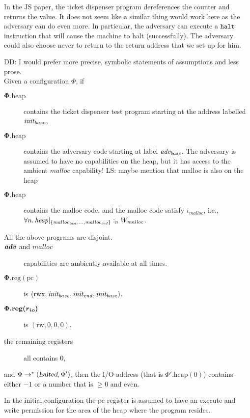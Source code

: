 \documentclass{article}
\newcommand{\restrictfun}[1]{|_{#1}}
\newcommand\lau[1]{{\color{purple} \sf \footnotesize {LS: #1}}\\}
\newcommand\dominique[1]{{\color{purple} \sf \footnotesize {DD: #1}}\\}
\newcommand{\var}[1]{\mathit{#1}}
\newcommand{\pcreg}{\mathrm{pc}}
\newcommand{\heap}{\var{heap}}
\newcommand{\plainproj}[1]{\mathrm{#1}}
\newcommand{\memheap}[1][\Phi]{#1.\plainproj{heap}}
\newcommand{\memreg}[1][\Phi]{#1.\plainproj{reg}}
\newcommand{\halted}{\textsl{halted}}
\newcommand{\heapSat}[3][\heap]{#1 :_{#2} #3}
\newcommand{\codelabel}[1]{\mathit{#1}}
\newcommand{\malloc}{\codelabel{malloc}}
\newcommand{\zinstr}[1]{\mathtt{#1}}
\newcommand{\halt}{\zinstr{halt}}
\newcommand{\plainperm}[1]{\mathrm{#1}}
\newcommand{\readwrite}{\plainperm{rw}}
\newcommand{\rwx}{\plainperm{rwx}}
\begin{document}
In the JS paper, the ticket dispenser program dereferences the counter and returns the value. It does not seem like a similar thing would work here as the adversary can do even more. In particular, the adversary can execute a $\halt$ instruction that will cause the machine to halt (successfully). The adversary could also choose never to return to the return address that we set up for him.
\begin{lemma}\dominique{I would prefer more precise, symbolic statements of assumptions and less prose.}
\label{lem:tckt-disp}
 Given a configuration $\Phi$, if
 \begin{description}
 \item[$\boldsymbol \memheap$] contains the ticket dispenser test program starting at the address labelled $\initb$, 
 \item[$\boldsymbol \memheap$] contains the adversary code starting at label $\advb$. The adversary is assumed to have no capabilities on the heap, but it has access to the ambient $\malloc$ capability! \lau{maybe mention that malloc is also on the heap}
 \item[$\boldsymbol \memheap$] contains the malloc code, and the malloc code satisfy $\iota_{\malloc}$, i.e., $\forall n \ldotp \heapSat[{\heap\restrictfun{\{\malloc_{\var{base}}, \dots ,\malloc_{\var{end}}\}}}]{n}{W_{\malloc}}$.
 \item[All the above programs are disjoint.]
 \item[$\boldsymbol{\adv}$ and $\boldsymbol{ \codelabel{malloc}}$] capabilities are ambiently available at all times.
 \item[$\boldsymbol{ \memreg(\pcreg)}$] is $(\rwx,\initb,\inite,\initb)$.
 \item[$\boldsymbol{ \memreg(\rio)}$] is $(\readwrite,0,0,0)$.
 \item[the remaining registers] all contains 0,
 \end{description}
 and $\Phi \rightarrow^* (\halted,\Phi')$, then the I/O address (that is $\memheap[\Phi'](0)$) contains either $-1$ or a number that is $\geq 0$ and even.
\end{lemma}
In the initial configuration the $\pcreg$ register is assumed to have an execute and write permission for the area of the heap where the program resides.
\end{document}
